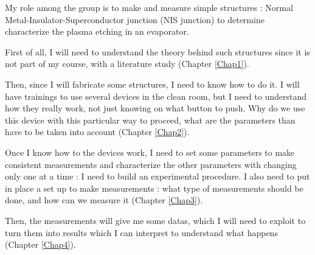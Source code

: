 My role among the group is to make and measure simple structures : Normal Metal-Insulator-Superconductor junction (NIS junction) to determine characterize the plasma etching in an evaporator.

First of all, I will need to understand the theory behind such structures since it is not part of my course, with a literature study (Chapter \ref{Chap1}).

Then, since I will fabricate some structures, I need to know how to do it. I will have trainings to use several devices in the clean room, but I need to understand how they really work, not just knowing on what button to push. Why do we use this device with this particular way to proceed, what are the parameters than have to be taken into account (Chapter \ref{Chap2}). 

Once I know how to the devices work, I need to set some parameters to make consistent measurements and characterize the other parameters with changing only one at a time : I need to build an experimental procedure. I also need to put in place a set up to make measurements : what type of measurements should be done, and how can we measure it (Chapter \ref{Chap3}).

Then, the measurements will give me some datas, which I will need to exploit to turn them into results which I can interpret to understand what happens (Chapter \ref{Chap4}).
